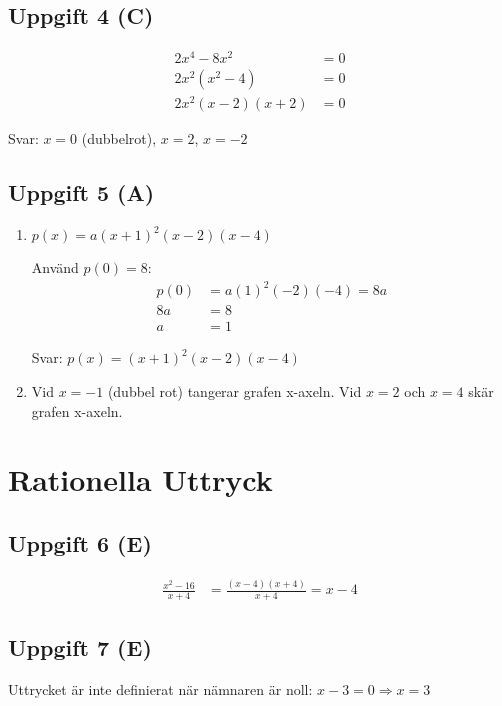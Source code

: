 \documentclass[12pt]{article}
\begin{document}
\subsection*{Uppgift 4 (C)}
\begin{facitbox}
\begin{align*}
2x^4 - 8x^2 &= 0 \\
2x^2(x^2 - 4) &= 0 \\
2x^2(x - 2)(x + 2) &= 0
\end{align*}

Svar: $x = 0$ (dubbelrot), $x = 2$, $x = -2$
\end{facitbox}

\subsection*{Uppgift 5 (A)}
\begin{facitbox}
\begin{enumerate}[label=\alph*)]
    \item $p(x) = a(x + 1)^2(x - 2)(x - 4)$
    
    Använd $p(0) = 8$:
    \begin{align*}
    p(0) &= a(1)^2(-2)(-4) = 8a \\
    8a &= 8 \\
    a &= 1
    \end{align*}
    
    Svar: $p(x) = (x + 1)^2(x - 2)(x - 4)$
    
    \item Vid $x = -1$ (dubbel rot) tangerar grafen x-axeln. Vid $x = 2$ och $x = 4$ skär grafen x-axeln.
\end{enumerate}
\end{facitbox}

\section{Rationella Uttryck}

\subsection*{Uppgift 6 (E)}
\begin{facitbox}
\begin{align*}
\frac{x^2 - 16}{x + 4} &= \frac{(x - 4)(x + 4)}{x + 4} = x - 4
\end{align*}
\end{facitbox}

\subsection*{Uppgift 7 (E)}
\begin{facitbox}
Uttrycket är inte definierat när nämnaren är noll: $x - 3 = 0 \Rightarrow x = 3$
\end{facitbox}
\end{document}
